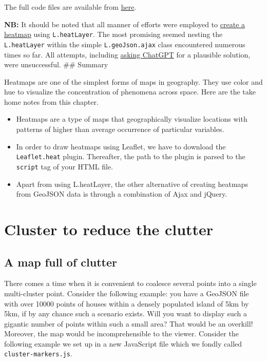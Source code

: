 \documentclass[
]{book}
\begin{document}
The full code files are available from \href{https://github.com/sammigachuhi/my-leaflet-project/tree/main/my-leaflet-code/chapter-9-Heatmaps}{here}.

\textbf{NB:} It should be noted that all manner of efforts were employed to \href{https://chat.openai.com/share/b76f0402-b1df-4585-997e-d2421cd68b6b}{create a heatmap} using \texttt{L.heatLayer}. The most promising seemed nesting the \texttt{L.heatLayer} within the simple \texttt{L.geoJson.ajax} class encountered numerous times so far. All attempts, including \href{https://chat.openai.com/share/7230d651-2959-407e-8e92-5500d470c8af}{asking ChatGPT} for a plausible solution, were unsuccessful.
\#\# Summary

Heatmaps are one of the simplest forms of maps in geography. They use color and hue to visualize the concentration of phenomena across space. Here are the take home notes from this chapter.

\begin{itemize}
\item
  Heatmaps are a type of maps that geographically visualize locations with patterns of higher than average occurrence of particular variables.
\item
  In order to draw heatmaps using Leaflet, we have to download the \texttt{Leaflet.heat} plugin. Thereafter, the path to the plugin is parsed to the \texttt{script} tag of your HTML file.
\item
  Apart from using L.heatLayer, the other alternative of creating heatmaps from GeoJSON data is through a combination of Ajax and jQuery.
\end{itemize}

\hypertarget{cluster-to-reduce-the-clutter}{%
\chapter{Cluster to reduce the clutter}\label{cluster-to-reduce-the-clutter}}

\hypertarget{a-map-full-of-clutter}{%
\section{A map full of clutter}\label{a-map-full-of-clutter}}

There comes a time when it is convenient to coalesce several points into a single multi-cluster point. Consider the following example: you have a GeoJSON file with over 10000 points of houses within a densely populated island of 5km by 5km, if by any chance such a scenario exists. Will you want to display such a gigantic number of points within such a small area? That would be an overkill! Moreover, the map would be incomprehensible to the viewer. Consider the following example we set up in a new JavaScript file which we fondly called \texttt{cluster-markers.js}.
\end{document}
